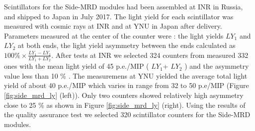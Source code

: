 

Scintillators for the Side-MRD modules had been assembled at INR in Russia, and shipped to Japan in July 2017. The light yield for each scintillator was measured with cosmic rays at INR and at YNU in Japan after delivery.  Parameters measured at the center of the counter were : the light yields  $LY_{1}$ and $LY_{2}$ at both ends, the light yield asymmetry between the ends calculated as $100\% \times \frac{LY_{1}-LY_{2}}{LY_{1}+LY_{2}}$.
After tests at INR we selected 324 counters from measured 332 ones with the mean light yield of 45 p.e./MIP ( $LY_{1}$+ $LY_{2}$ ) and the asymmetry value less than 10 \% . 
The measuremens at YNU yielded the average total light yield of about 40 p.e./MIP which varies in range  from 32 to 50 p.e/MIP  (Figure \ref{fig:side_mrd_ly} (left)). Only two counters  showed relatively high asymmetry close to 25 \% as shown in Figure \ref{fig:side_mrd_ly} (right). 
Using the results of the quality assurance test  we selected 320 scintillator counters for the Side-MRD modules. 

